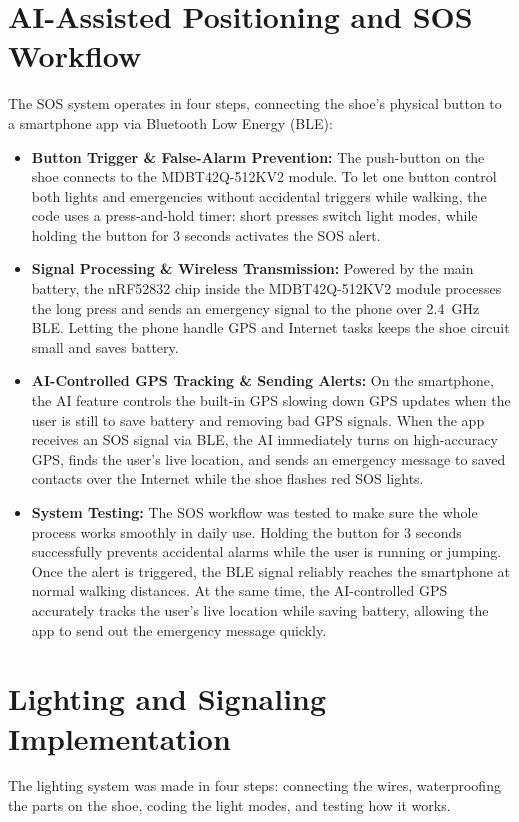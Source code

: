 \section{AI-Assisted Positioning and SOS Workflow} %
The SOS system operates in four steps, connecting the shoe's physical button to a smartphone app via Bluetooth Low Energy (BLE):
\begin{itemize}[label=--]
    \item \textbf{Button Trigger \& False-Alarm Prevention:} The push-button on the shoe connects to the MDBT42Q-512KV2 module. To let one button control both lights and emergencies without accidental triggers while walking, the code uses a press-and-hold timer: short presses switch light modes, while holding the button for 3 seconds activates the SOS alert.
    \item \textbf{Signal Processing \& Wireless Transmission:} Powered by the main battery, the nRF52832 chip inside the MDBT42Q-512KV2 module processes the long press and sends an emergency signal to the phone over 2.4~GHz BLE\@. Letting the phone handle GPS and Internet tasks keeps the shoe circuit small and saves battery.
    \item \textbf{AI-Controlled GPS Tracking \& Sending Alerts:} On the smartphone, the AI feature controls the built-in GPS slowing down GPS updates when the user is still to save battery and removing bad GPS signals. When the app receives an SOS signal via BLE, the AI immediately turns on high-accuracy GPS, finds the user's live location, and sends an emergency message to saved contacts over the Internet while the shoe flashes red SOS lights.
    \item \textbf{System Testing:} The SOS workflow was tested to make sure the whole process works smoothly in daily use. Holding the button for 3 seconds successfully prevents accidental alarms while the user is running or jumping. Once the alert is triggered, the BLE signal reliably reaches the smartphone at normal walking distances. At the same time, the AI-controlled GPS accurately tracks the user's live location while saving battery, allowing the app to send out the emergency message quickly.
\end{itemize}

\section{Lighting and Signaling Implementation} %
The lighting system was made in four steps: connecting the wires, waterproofing the parts on the shoe, coding the light modes, and testing how it works.

